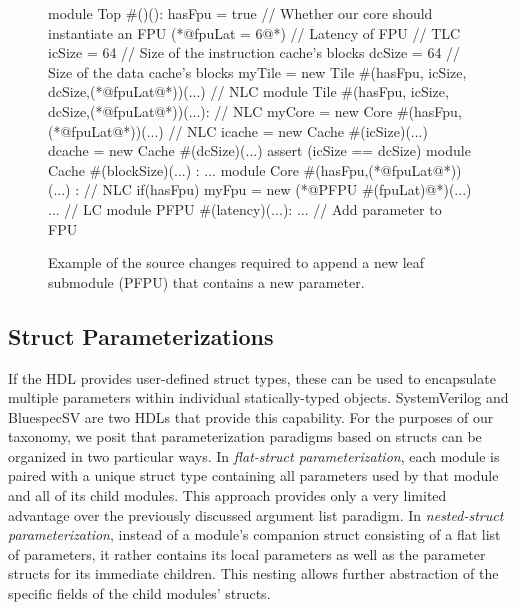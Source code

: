 \begin{figure}
\centering
\begin{phdl}
module Top #()():
  hasFpu = true  // Whether our core should instantiate an FPU
  (*@\textcolor[rgb]{1,0,0}{fpuLat = 6}@*)     // Latency of FPU                               // TLC
  icSize = 64    // Size of the instruction cache's blocks
  dcSize = 64    // Size of the data cache's blocks
  myTile = new Tile #(hasFpu, icSize, dcSize,(*@\textcolor[rgb]{1,0,0}{fpuLat}@*))(...)        // NLC
module Tile #(hasFpu, icSize, dcSize,(*@\textcolor[rgb]{1,0,0}{fpuLat}@*))(...):               // NLC
  myCore = new Core  #(hasFpu, (*@\textcolor[rgb]{1,0,0}{fpuLat}@*))(...)                      // NLC
  icache = new Cache #(icSize)(...)
  dcache = new Cache #(dcSize)(...)
  assert (icSize == dcSize) 
module Cache #(blockSize)(...) : ... 
module Core #(hasFpu,(*@\textcolor[rgb]{1,0,0}{fpuLat}@*))(...) :                              // NLC
  if(hasFpu) myFpu = new (*@\textcolor[rgb]{1,0,0}{PFPU \#(fpuLat)}@*)(...) ...                 // LC
module PFPU #(latency)(...): ...     // Add parameter to FPU 
\end{phdl}
\caption{Example of the source changes required to append a new leaf submodule (PFPU) that contains a new parameter.}
\label{fig:arglist-delta}
\end{figure}

\subsection{Struct Parameterizations}

If the HDL provides user-defined struct types, these can be used to encapsulate multiple parameters within individual statically-typed objects.
SystemVerilog and BluespecSV are two HDLs that provide this capability.
For the purposes of our taxonomy, we posit that parameterization paradigms based on structs can be organized in two particular ways.
In \emph{flat-struct parameterization}, each module is paired with a unique struct type containing all parameters used by that module and all of its child modules.
This approach provides only a very limited advantage over the previously discussed argument list paradigm.
In \emph{nested-struct parameterization}, instead of a module's companion struct consisting of a flat list of parameters,
it rather contains its local parameters as well as the parameter structs for its immediate children. 
This nesting allows further abstraction of the specific fields of the child modules' structs.

